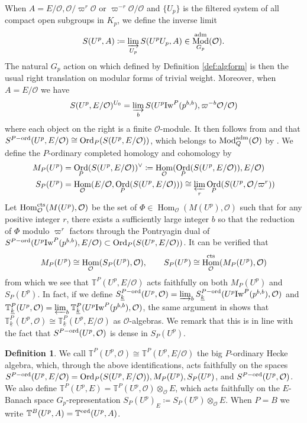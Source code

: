 \documentclass[leqno]{amsart}
\theoremstyle{definition}
\newtheorem{defn}[thm]{Definition}
\theoremstyle{remark}
\newcommand{\oo}{\mathcal{O}}
\DeclareMathOperator{\Hom}{Hom}
\newcommand{\cts}{\textnormal{cts}}
\DeclareMathOperator{\Mod}{\textnormal{Mod}}
\DeclareMathOperator{\Ord}{Ord} %
\newcommand{\adm}{\textnormal{adm}}
\newcommand{\wt}[1]{\underline{ #1 }}
\newcommand{\Iw}{\textnormal{Iw}} %
\newcommand{\TT}{\mathbb{T}} %
\newcommand{\ord}{\textnormal{ord}} %
\begin{document}
When $A=E/\oo, \oo/\varpi^{r}\oo$ or $\varpi^{-r}\oo/\oo$
and $\{U_p\}$ is the filtered system of
all compact open subgroups in $K_p$, 
we define the inverse limit
\begin{equation}\label{eq:complete}
	S(U^p,A)\coloneqq
	\varinjlim_{U_p}S(U^pU_p,A)\in 
	\Mod^{\adm}_{G_p}(\oo).
\end{equation}
The natural $G_p$ action on which
defined by Definition \ref{def:algform}
is then the usual right translation
on modular forms of trivial weight.
Moreover, when $A=E/\oo$ we have
\[
	S(U^p,E/\oo)^{U_0}=
	\varinjlim_{b}
	S(U^p\Iw^P(p^{b,b}),\varpi^{-b}\oo/\oo)
\]
where each object on the right is 
a finite $\oo$-module.
It then follows from \cite[Lem 3.1.5]{emeI} and \cite[Prop 3.2.4]{emeI}
that $S^{P-\ord}(U^p,E/\oo)\cong \Ord_P(S(U^p,E/\oo))$,
which belongs to $\Mod^{\adm}_Q(\oo)$
by \cite[Thm 3.3.3]{emeI}.
We define the $P$-ordinary completed homology and cohomology by
\begin{align}\label{eq:completed_coh}
	M_P(U^p)&=
	\Ord_P(S(U^p,E/\oo))^\vee
	\coloneqq \Hom_\oo(\Ord_P(S(U^p,E/\oo)),E/\oo)\\
	S_P(U^p)&=\Hom_\oo(E/\oo, \Ord_P(S(U^p,E/\oo)))
	\cong \varprojlim_r \Ord_P(S(U^p,\oo/\varpi^{r}))
\end{align}
Let $\Hom_\oo^{\cts}(M(U^p),\oo)$
be the set of
$\Phi\in \Hom_\oo(M(U^p),\oo)$ 
such that for any positive integer $r$,
there exists a sufficiently large integer $b$ so that 
the reduction of $\Phi$ modulo $\varpi^r$
factors through
the Pontryagin dual of 
$S^{P-\ord}(U^p\Iw^P(p^{b,b}),E/\oo)\subset \Ord_P(S(U^p,E/\oo))$. 
It can be verified that 
\begin{equation}\label{eq:complete_isom}
	M_P(U^p)\cong \Hom_\oo(S_P(U^p),\oo),\qquad
	S_P(U^p)\cong \Hom_\oo^{\cts}(M_P(U^p),\oo)
\end{equation}
from which we see that
$\TT^P(U^p,E/\oo)$ acts faithfully
on both $M_P(U^p)$ and  $S_P(U^p)$.
In fact, 
if we define $S_{\wt{k}}^{P-\ord}(U^p,\oo)
=\varinjlim_{b}S_{\wt{k}}^{P-\ord}(U^p\Iw^P(p^{b,b}),\oo)$ and 
$\TT^P_{\wt{k}}(U^p,\oo)=
\varprojlim_b\TT_{\wt{k}}^{P}(U^p\Iw^P(p^{b,b}),\oo)$,
the same argument in \cite[Lem 2.17]{ger}
shows that  $\TT^P_{\wt{k}}(U^p,\oo)\cong \TT^P_{\wt{k}}(U^p,E/\oo)$
as $\oo$-algebras.
We remark that this is in line with the fact that 
$S^{P-\ord}(U^p,\oo)$ is dense in $S_P(U^p)$.

\begin{defn}\label{def:big_hecke}
    We call $\TT^P(U^p,\oo)\cong \TT^P(U^p,E/\oo)$
	the big $P$-ordinary Hecke algebra,
    which, through the above identifications,
    acts faithfully on the spaces
	$S^{P-\ord}(U^p,E/\oo)=\Ord_P(S(U^p,E/\oo)), M_P(U^p), S_P(U^p)$,
	and $S^{P-\ord}(U^p,\oo)$. 
	We also define $\TT^P(U^p,E)=\TT^P(U^p,\oo)\otimes_{\oo}E$,
	which acts faithfully
	on the $E$-Banach space $G_p$-representation
    $S_P(U^p)_E\coloneqq S_P(U^p)\otimes_{\oo}E$.
    When $P=B$ we write 
    $\TT^B(U^p,A)=\TT^{\ord}(U^p,A)$.
\end{defn}
\end{document}
